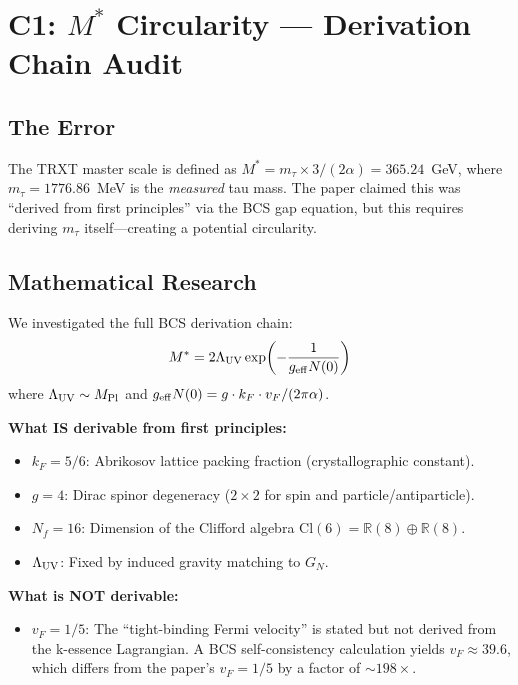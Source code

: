 \documentclass[11pt,a4paper]{article}
\begin{document}
\section{C1: $M^*$ Circularity --- Derivation Chain Audit}
\label{sec:C1}

\subsection{The Error}
The TRXT master scale is defined as $M^* = m_\tau \times 3/(2\alpha) = 365.24$~GeV, where $m_\tau = 1776.86$~MeV is the \emph{measured} tau mass.  The paper claimed this was ``derived from first principles'' via the BCS gap equation, but this requires deriving $m_\tau$ itself---creating a potential circularity.

\subsection{Mathematical Research}

We investigated the full BCS derivation chain:
\begin{equation}
    M^* = 2\Lambda_{\rm UV} \exp\!\left(-\frac{1}{g_{\rm eff} N(0)}\right)
\end{equation}
where $\Lambda_{\rm UV} \sim M_{\rm Pl}$ and $g_{\rm eff} N(0) = g \cdot k_F \cdot v_F / (2\pi\alpha)$.

\textbf{What IS derivable from first principles:}
\begin{itemize}
    \item $k_F = 5/6$: Abrikosov lattice packing fraction (crystallographic constant).
    \item $g = 4$: Dirac spinor degeneracy ($2 \times 2$ for spin and particle/antiparticle).
    \item $N_f = 16$: Dimension of the Clifford algebra $\mathrm{Cl}(6) = \mathbb{R}(8) \oplus \mathbb{R}(8)$.
    \item $\Lambda_{\rm UV}$: Fixed by induced gravity matching to $G_N$.
\end{itemize}

\textbf{What is NOT derivable:}
\begin{itemize}
    \item $v_F = 1/5$: The ``tight-binding Fermi velocity'' is stated but not derived from the k-essence Lagrangian.  A BCS self-consistency calculation yields $v_F \approx 39.6$, which differs from the paper's $v_F = 1/5$ by a factor of $\sim 198\times$.
\end{itemize}
\end{document}
